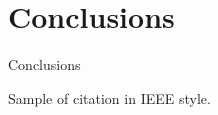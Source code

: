 \chapter{Conclusions}

Conclusions

Sample of citation \cite{DBLP:journals/sigcas/X91} in IEEE style.









%
%
%
%
%
%
%
%
%
